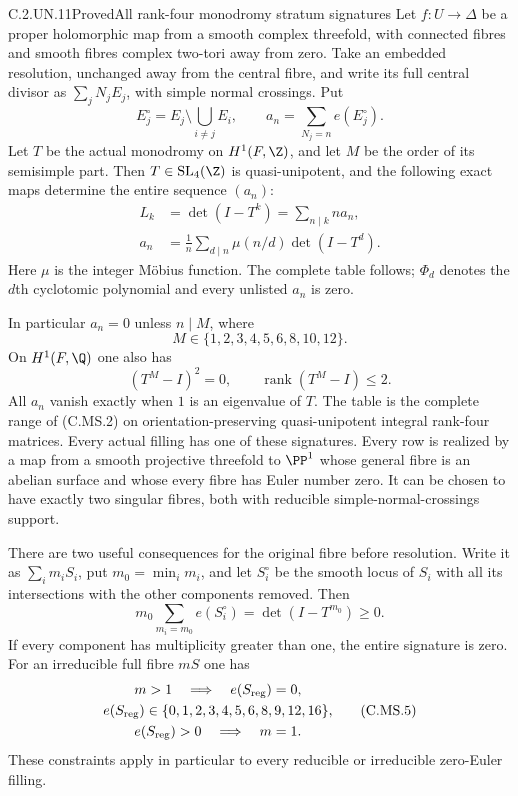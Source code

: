 \begin{statement}{C.2.UN.11}{Proved}{All rank-four monodromy stratum signatures}
Let $f:U\to\Delta$ be a proper holomorphic map from a
smooth complex threefold, with connected fibres and
smooth fibres complex two-tori away from zero. Take
an embedded resolution, unchanged away from the
central fibre, and write its full central divisor as
$\sum_jN_jE_j$, with simple normal crossings. Put
\[
 E_j^\circ=E_j\setminus\bigcup_{i\ne j}E_i,
 \qquad a_n=\sum_{N_j=n}e(E_j^\circ).
 \tag{C.MS.1}
\]
Let $T$ be the actual monodromy on $H^1(F,\Z)$,
and let $M$ be the order of its semisimple part.
Then $T\in\operatorname{SL}_4(\Z)$ is
quasi-unipotent, and the following exact maps
determine the entire sequence $(a_n)$:
\[
 \begin{aligned}
 L_k&=\det(I-T^k)
       =\sum_{n\mid k}n a_n,\\
 a_n&=\frac1n\sum_{d\mid n}\mu(n/d)\det(I-T^d).
 \end{aligned}                                  \tag{C.MS.2}
\]
Here $\mu$ is the integer M\"obius function.
The complete table follows; $\Phi_d$ denotes
the $d$th cyclotomic polynomial and every
unlisted $a_n$ is zero.



In particular $a_n=0$ unless $n\mid M$, where
\[
                 M\in\{1,2,3,4,5,6,8,10,12\}.
 \tag{C.MS.3}
\]
On $H^1(F,\Q)$ one also has
\[
                  (T^M-I)^2=0,
                  \qquad\operatorname{rank}(T^M-I)\le2.
 \tag{C.MS.10}
\]
All $a_n$ vanish exactly when $1$ is an eigenvalue
of $T$. The table is the complete range of (C.MS.2)
on orientation-preserving quasi-unipotent integral
rank-four matrices. Every actual filling has one
of these signatures. Every row is realized by a
map from a smooth projective threefold to $\PP^1$
whose general fibre is an abelian surface and
whose every fibre has Euler number zero. It
can be chosen to have exactly two singular
fibres, both with reducible simple-normal-crossings
support.

There are two useful consequences for the original
fibre before resolution. Write it as $\sum_i m_iS_i$,
put $m_0=\min_i m_i$, and let $S_i^\circ$ be the
smooth locus of $S_i$ with all its intersections
with the other components removed. Then
\[
 m_0\sum_{m_i=m_0}e(S_i^\circ)
                    =\det(I-T^{m_0})\ge0.        \tag{C.MS.4}
\]
If every component has multiplicity greater than
one, the entire signature is zero. For an
irreducible full fibre $mS$ one has
\[
 \begin{gathered}
 m>1\quad\Longrightarrow\quad e(S_{\rm reg})=0,\\
 e(S_{\rm reg})\in
       \{0,1,2,3,4,5,6,8,9,12,16\},\\
 e(S_{\rm reg})>0\quad\Longrightarrow\quad m=1.
 \end{gathered}                                  \tag{C.MS.5}
\]
These constraints apply in particular to every
reducible or irreducible zero-Euler filling.
\end{statement}
